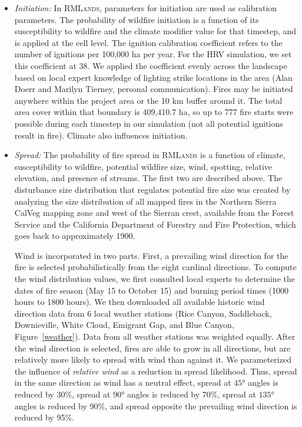 \begin{itemize}
\item \emph{Initiation:} In \textsc{RMLands}, parameters for initiation are used as calibration parameters. The probability of wildfire initiation is a function of its susceptibility to wildfire and the climate modifier value for that timestep, and is applied at the cell level. The ignition calibration coefficient refers to the number of ignitions per 100,000 ha per year. For the HRV simulation, we set this coefficient at 38. We applied the coefficient evenly across the landscape based on local expert knowledge of lighting strike locations in the area (Alan Doerr and Marilyn Tierney, personal communication). Fires may be initiated anywhere within the project area or the 10 km buffer around it. The total area cover within that boundary is 409,410.7 ha, so up to 777 fire starts were possible during each timestep in our simulation (not all potential ignitions result in fire). Climate also influences initiation.


\item \emph{Spread:} The probability of fire spread in \textsc{RMLands} is a function of climate, susceptibility to wildfire, potential wildfire size, wind, spotting, relative elevation, and presence of streams. The first two are described above. The disturbance size distribution that regulates potential fire size was created by analyzing the size distribution of all mapped fires in the Northern Sierra CalVeg mapping zone and west of the Sierran crest, available from the Forest Service and the California Department of Forestry and Fire Protection, which goes back to approximately 1900. 

Wind is incorporated in two parts. First, a prevailing wind direction for the fire is selected probabilistically from the eight cardinal directions. To compute the wind distribution values, we first consulted local experts to determine the dates of fire season (May 15 to October 15) and burning period times (1000 hours to 1800 hours). We then downloaded all available historic wind direction data from 6 local weather stations (Rice Canyon, Saddleback, Downieville, White Cloud, Emigrant Gap, and Blue Canyon, Figure~\ref{weather}). Data from all weather stations was weighted equally. After the wind direction is selected, fires are able to grow in all directions, but are relatively more likely to spread with wind than against it. We parameterized the influence of \emph{relative wind} as a reduction in spread likelihood. Thus, spread in the same direction as wind has a neutral effect, spread at $\ang{45}$ angles is reduced by 30\%, spread at $\ang{90}$  angles is reduced by 70\%, spread at $\ang{135}$ angles is reduced by 90\%, and spread opposite the prevailing wind direction is reduced by 95\%. 


\end{itemize}
